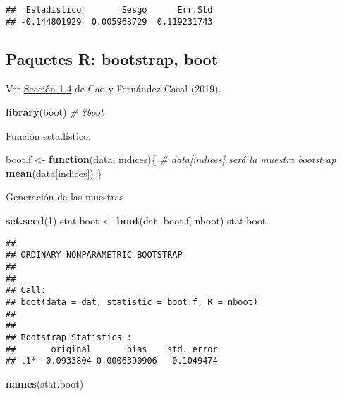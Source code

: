 \documentclass[
]{book}
\newenvironment{Shaded}{\begin{snugshade}}{\end{snugshade}}
\newcommand{\CommentTok}[1]{\textcolor[rgb]{0.56,0.35,0.01}{\textit{#1}}}
\newcommand{\ControlFlowTok}[1]{\textcolor[rgb]{0.13,0.29,0.53}{\textbf{#1}}}
\newcommand{\DecValTok}[1]{\textcolor[rgb]{0.00,0.00,0.81}{#1}}
\newcommand{\KeywordTok}[1]{\textcolor[rgb]{0.13,0.29,0.53}{\textbf{#1}}}
\newcommand{\NormalTok}[1]{#1}
\newcommand{\StringTok}[1]{\textcolor[rgb]{0.31,0.60,0.02}{#1}}
\theoremstyle{break}
\theoremstyle{definition}
\theoremstyle{definition}
\theoremstyle{definition}
\theoremstyle{remark}
\begin{document}
\begin{verbatim}
##  Estadístico        Sesgo      Err.Std 
## -0.144801929  0.005968729  0.119231743
\end{verbatim}

\hypertarget{paquetes-r-bootstrap-boot}{%
\subsection{Paquetes R: bootstrap, boot}\label{paquetes-r-bootstrap-boot}}

Ver \href{https://rubenfcasal.github.io/book_remuestreo/cap1-paquetes.html}{Sección 1.4} de Cao y Fernández-Casal (2019).

\begin{Shaded}
\begin{Highlighting}[]
\KeywordTok{library}\NormalTok{(boot)}
\CommentTok{# ?boot}
\end{Highlighting}
\end{Shaded}

Función estadístico:

\begin{Shaded}
\begin{Highlighting}[]
\NormalTok{boot.f <-}\StringTok{ }\ControlFlowTok{function}\NormalTok{(data, indices)\{}
  \CommentTok{# data[indices] será la muestra bootstrap}
  \KeywordTok{mean}\NormalTok{(data[indices])}
\NormalTok{\}}
\end{Highlighting}
\end{Shaded}

Generación de las muestras

\begin{Shaded}
\begin{Highlighting}[]
\KeywordTok{set.seed}\NormalTok{(}\DecValTok{1}\NormalTok{)}
\NormalTok{stat.boot <-}\StringTok{ }\KeywordTok{boot}\NormalTok{(dat, boot.f, nboot)}
\NormalTok{stat.boot}
\end{Highlighting}
\end{Shaded}

\begin{verbatim}
## 
## ORDINARY NONPARAMETRIC BOOTSTRAP
## 
## 
## Call:
## boot(data = dat, statistic = boot.f, R = nboot)
## 
## 
## Bootstrap Statistics :
##       original       bias    std. error
## t1* -0.0933804 0.0006390906   0.1049474
\end{verbatim}

\begin{Shaded}
\begin{Highlighting}[]
\KeywordTok{names}\NormalTok{(stat.boot)}
\end{Highlighting}
\end{Shaded}
\end{document}
